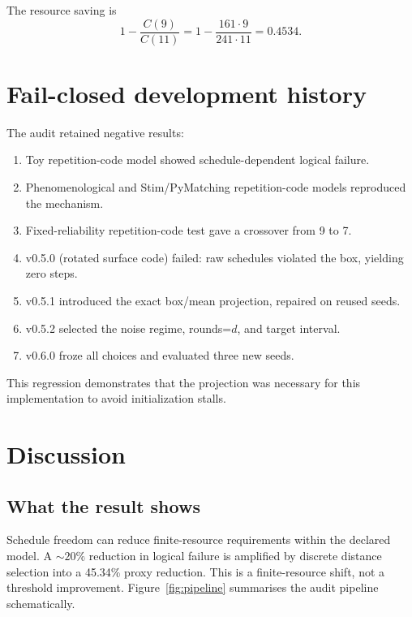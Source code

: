 \documentclass[11pt]{article}
\begin{document}
The resource saving is
\begin{equation}
  1-\frac{C(9)}{C(11)}
  =1-\frac{161\cdot9}{241\cdot11}
  =0.4534.
  \label{eq:saving}
\end{equation}

\section{Fail-closed development history}

The audit retained negative results:
\begin{enumerate}
\item Toy repetition-code model showed schedule-dependent logical failure.
\item Phenomenological and Stim/PyMatching repetition-code models reproduced the mechanism.
\item Fixed-reliability repetition-code test gave a crossover from 9 to 7.
\item v0.5.0 (rotated surface code) failed: raw schedules violated the box, yielding zero steps.
\item v0.5.1 introduced the exact box/mean projection, repaired on reused seeds.
\item v0.5.2 selected the noise regime, rounds=\(d\), and target interval.
\item v0.6.0 froze all choices and evaluated three new seeds.
\end{enumerate}
This regression demonstrates that the projection was necessary for this implementation to avoid initialization stalls.

\section{Discussion}

\subsection{What the result shows}

Schedule freedom can reduce finite-resource requirements within the declared model. A \(\sim20\%\) reduction in logical failure is amplified by discrete distance selection into a 45.34\% proxy reduction. This is a finite-resource shift, not a threshold improvement. Figure~\ref{fig:pipeline} summarises the audit pipeline schematically.
\end{document}
